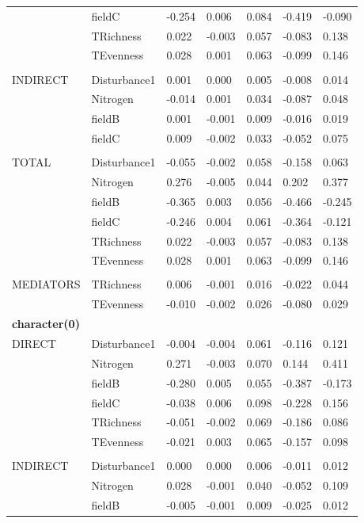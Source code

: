 \begin{longtable}[c]{l l l l l l l }
 & fieldC & -0.254 & 0.006 & 0.084 & -0.419 & -0.090\\
 & TRichness & 0.022 & -0.003 & 0.057 & -0.083 & 0.138\\
 & TEvenness & 0.028 & 0.001 & 0.063 & -0.099 & 0.146\\
 & & & & & & \\
 INDIRECT & Disturbance1 & 0.001 & 0.000 & 0.005 & -0.008 & 0.014\\
 & Nitrogen & -0.014 & 0.001 & 0.034 & -0.087 & 0.048\\
 & fieldB & 0.001 & -0.001 & 0.009 & -0.016 & 0.019\\
 & fieldC & 0.009 & -0.002 & 0.033 & -0.052 & 0.075\\
 & & & & & & \\
 TOTAL & Disturbance1 & -0.055 & -0.002 & 0.058 & -0.158 & 0.063\\
 & Nitrogen & 0.276 & -0.005 & 0.044 & 0.202 & 0.377\\
 & fieldB & -0.365 & 0.003 & 0.056 & -0.466 & -0.245\\
 & fieldC & -0.246 & 0.004 & 0.061 & -0.364 & -0.121\\
 & TRichness & 0.022 & -0.003 & 0.057 & -0.083 & 0.138\\
 & TEvenness & 0.028 & 0.001 & 0.063 & -0.099 & 0.146\\
 & & & & & & \\
 MEDIATORS &TRichness & 0.006 & -0.001 & 0.016 & -0.022 & 0.044\\
 & TEvenness & -0.010 & -0.002 & 0.026 & -0.080 & 0.029\\
\textbf{character(0)} &  &  &  &  &  &\\
\hline
 DIRECT & Disturbance1 & -0.004 & -0.004 & 0.061 & -0.116 & 0.121\\
 & Nitrogen & 0.271 & -0.003 & 0.070 & 0.144 & 0.411\\
 & fieldB & -0.280 & 0.005 & 0.055 & -0.387 & -0.173\\
 & fieldC & -0.038 & 0.006 & 0.098 & -0.228 & 0.156\\
 & TRichness & -0.051 & -0.002 & 0.069 & -0.186 & 0.086\\
 & TEvenness & -0.021 & 0.003 & 0.065 & -0.157 & 0.098\\
 & & & & & & \\
 INDIRECT & Disturbance1 & 0.000 & 0.000 & 0.006 & -0.011 & 0.012\\
 & Nitrogen & 0.028 & -0.001 & 0.040 & -0.052 & 0.109\\
 & fieldB & -0.005 & -0.001 & 0.009 & -0.025 & 0.012\\

\end{longtable}
